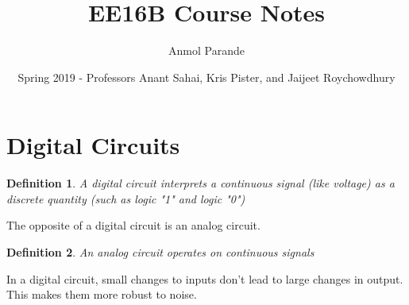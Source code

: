 \documentclass{article}
\newtheorem{definition}{Definition}
\begin{document}
\title{EE16B Course Notes}
\author{Anmol Parande}
\date{Spring 2019 - Professors Anant Sahai, Kris Pister, and Jaijeet Roychowdhury}
\maketitle
\tableofcontents
\newpage
\section{Digital Circuits}
\begin{definition}
    A digital circuit interprets a continuous signal (like voltage) as a discrete quantity (such as logic "1" and logic "0")\\
    \begin{figure}[!h]
    \centering
    \end{figure}
\end{definition}
The opposite of a digital circuit is an analog circuit.
\begin{definition}
    An analog circuit operates on continuous signals
\end{definition}
In a digital circuit, small changes to inputs don't lead to large changes in output. This makes them more robust to noise.
\end{document}
